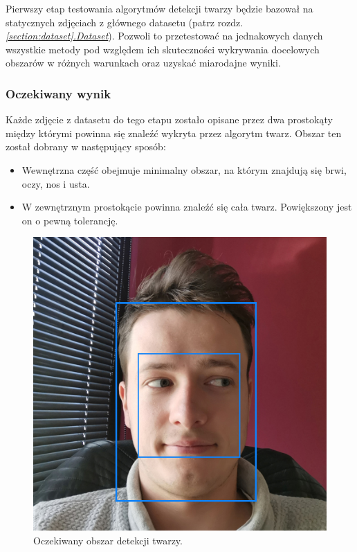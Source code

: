 Pierwszy etap testowania algorytmów detekcji twarzy będzie bazował na statycznych zdjęciach z głównego datasetu (patrz rozdz. \hyperref[section:dataset]{\textit{\ref{section:dataset}.Dataset}}). Pozwoli to przetestować na jednakowych danych wszystkie metody pod względem ich skuteczności wykrywania docelowych obszarów w różnych warunkach oraz uzyskać miarodajne wyniki.

\subsubsection{Oczekiwany wynik}

Każde zdjęcie z datasetu do tego etapu zostało opisane przez dwa prostokąty między którymi powinna się znaleźć wykryta przez algorytm twarz. Obszar ten został dobrany w następujący sposób:

\begin{itemize}
    \item Wewnętrzna część obejmuje minimalny obszar, na którym znajdują się brwi, oczy, nos i usta.
    \item W zewnętrznym prostokącie powinna znaleźć się cała twarz. Powiększony jest on o pewną tolerancję. 
\end{itemize}

\begin{figure}[!h]
    \begin{center}
        \includegraphics[scale=0.3]{img/face_section/face_test_expected.jpg}
        \caption{Oczekiwany obszar detekcji twarzy. }
        \label{fig:face_test_expected}
    \end{center}
\end{figure}

